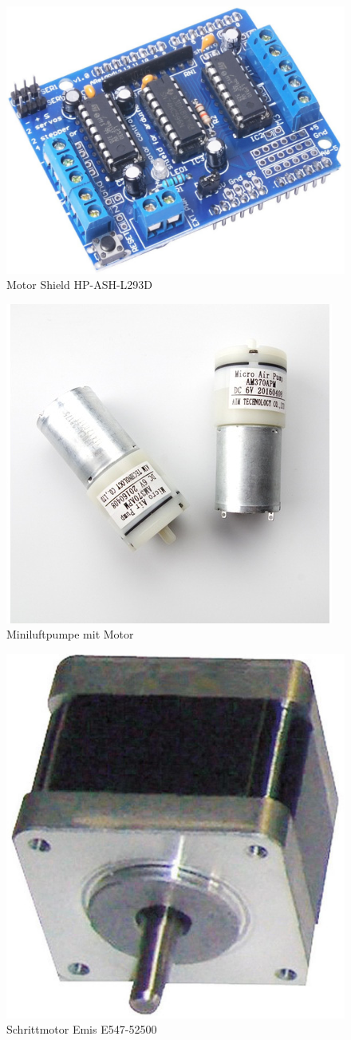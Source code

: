 \begin{figure}
    \centering
    \includegraphics[width=0.5\linewidth]{pics/motorshield.jpg}
    \caption{Motor Shield HP-ASH-L293D}
    \label{fig:motorshield}
\end{figure}

\begin{figure}
    \centering
    \includegraphics[width=0.5\linewidth]{pics/luftpumpe.jpg}
    \caption{Miniluftpumpe mit Motor}
    \label{fig:luftpumpe}
\end{figure}

\begin{figure}
    \centering
    \includegraphics[width=0.5\linewidth]{pics/schrittmotor.jpg}
    \caption{Schrittmotor Emis E547-52500}
    \label{fig:schrittmotor}
\end{figure}

